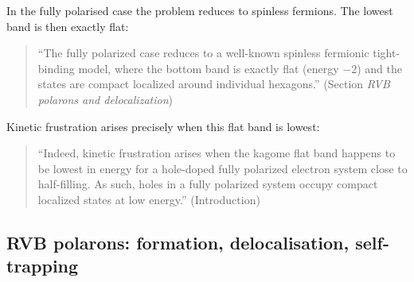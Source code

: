 In the fully polarised case the problem reduces to spinless fermions. The
lowest band is then exactly flat:
\begin{quote}\QM
``The fully polarized case reduces to a well-known spinless fermionic
tight-binding model, where the bottom band is exactly flat (energy $-2$) and
the states are compact localized around individual hexagons.''
(Section \emph{RVB polarons and delocalization})
\end{quote}
Kinetic frustration arises precisely when this flat band is lowest:
\begin{quote}\QM
``Indeed, kinetic frustration arises when the kagome flat band happens to be
lowest in energy for a hole-doped fully polarized electron system close to
half-filling. As such, holes in a fully polarized system occupy compact
localized states at low energy.'' (Introduction)
\end{quote}

\subsection{RVB polarons: formation, delocalisation, self-trapping}

